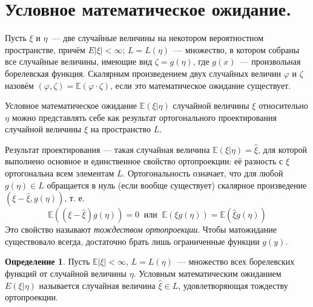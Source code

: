 \documentclass[oneside,final,14pt]{extreport}
\theoremstyle{definition}
\newtheorem{defn}{Определение}[section]
\begin{document}
\section{Условное математическое ожидание.}

Пусть $\xi$ и $\eta$~--- две случайные величины на некотором вероятностном пространстве, причём $E|\xi|<\infty$; $L=L(\eta)$~--- множество, в котором собраны все случайные величины, имеющие вид $\zeta=g(\eta)$, где $g(x)$~--- произвольная борелевская функция. Скалярным произведением двух случайных величин $\varphi$ и $\zeta$ назовём $(\varphi, \zeta)=\mathbb{E}(\varphi \cdot \zeta)$, если это математическое ожидание существует.

Условное математическое ожидание $\mathbb{E}(\xi | \eta)$ случайной величины $\xi$ относительно $\eta$ можно представлять себе как результат ортогонального проектирования случайной величины $\xi$ на пространство $L$.

Результат проектирования — такая случайная величина $\mathbb{E}(\xi | \eta)=\widehat{\xi}$, для которой выполнено основное и единственное свойство ортопроекции: её разность с $\xi$ ортогональна всем элементам $L$. Ортогональность означает, что для любой $g(\eta) \in L$ обращается в нуль (если вообще существует) скалярное произведение $(\xi-\widehat{\xi}, g(\eta))$, т. е.
\begin{equation*}
    \mathbb{E}((\xi-\widehat{\xi}) g(\eta))=0~ \text{ или }~ \mathbb{E}(\xi g(\eta))=\mathbb{E}(\widehat{\xi} g(\eta))
\end{equation*}
Это свойство называют {\it тождеством ортопроекции}. Чтобы матожидание существовало всегда, достаточно брать лишь ограниченные функции $g(y)$.

\begin{defn}
    Пусть $\mathbb{E}|\xi|<\infty$, $L=L(\eta)$~--- множество всех борелевских функций от случайной величины $\eta$. Условным математическим ожиданием $E(\xi | \eta)$ называется случайная величина $\widehat{\xi} \in L$, удовлетворяющая тождеству ортопроекции.
\end{defn}
\end{document}
